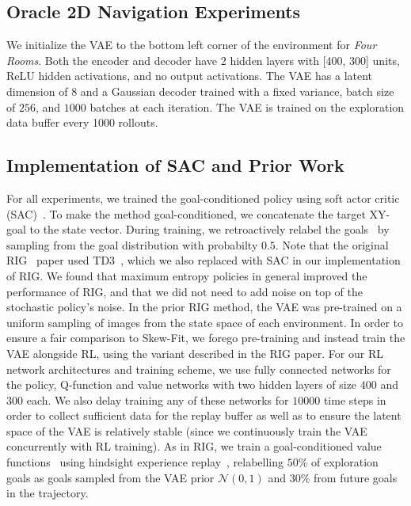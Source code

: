 \subsection{Oracle 2D Navigation Experiments}\label{sec:2d-details}
We initialize the VAE to the bottom left corner of the environment for \textit{Four Rooms}.
Both the encoder and decoder have 2 hidden layers with [400, 300] units,  ReLU hidden activations, and no output activations.
The VAE has a latent dimension of $8$ and a Gaussian decoder trained with a fixed variance, batch size of $256$, and $1000$ batches at each iteration. The VAE is trained on the exploration data buffer every 1000 rollouts.

\subsection{Implementation of SAC and Prior Work}\label{sec:prior-work-implementation}
\sloppy For all experiments, we trained the goal-conditioned policy using soft actor critic (SAC)~\citep{haarnoja2018sacapp}.
To make the method goal-conditioned, we concatenate the target XY-goal to the state vector.
During training, we retroactively relabel the goals~\citep{kaelbling1993goals,andrychowicz2017her} by sampling from the goal distribution with probabilty $0.5$.
Note that the original RIG~\cite{nair2018rig} paper used TD3~\cite{fujimoto2018td3}, which we also replaced with SAC in our implementation of RIG.
We found that maximum entropy policies in general improved the performance of RIG, and that we did not need to add noise on top of the stochastic policy's noise.
In the prior RIG method, the VAE was pre-trained on a uniform sampling of images from the state space of each environment.
In order to ensure a fair comparison to Skew-Fit, we forego pre-training and instead train the VAE alongside RL, using the variant described in the RIG paper.
For our RL network architectures and training scheme, we use fully connected networks for the policy, Q-function and value networks with two hidden layers of size $400$ and $300$ each.
We also delay training any of these networks for $10000$ time steps in order to collect sufficient data for the replay buffer as well as to ensure the latent space of the VAE is relatively stable (since we continuously train the VAE concurrently with RL training).
As in RIG, we train a goal-conditioned value functions~\cite{schaul2015uva} using hindsight experience replay~\cite{andrychowicz2017her}, relabelling $50\%$ of exploration goals as goals sampled from the VAE prior $\mathcal{N} (0, 1)$ and $30\%$ from future goals in the trajectory.

